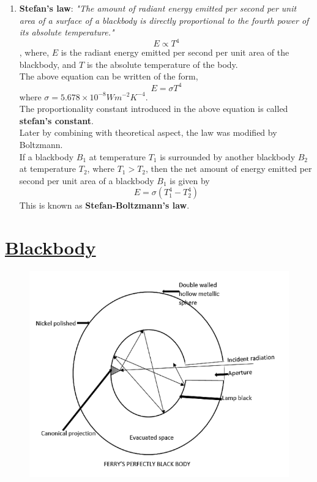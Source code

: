 \documentclass[14pt,a4paper]{article}
\begin{document}
\begin{enumerate}
    \item \textbf{Stefan's law}:  \textit{"The amount of radiant energy emitted per second per unit area of a surface of a blackbody is directly proportional to the fourth power of its absolute temperature."}
    \begin{equation}
        E \propto T^{4}
    \end{equation},
    where, $E$ is the radiant energy emitted per second per unit area of the blackbody, and $T$ is the absolute temperature of the body.\\
    The above equation can be written of the form,
    \begin{equation}
        E = \sigma T^{4}
    \end{equation}
    where $\sigma = 5.678 \times 10^{-8} Wm^{-2}K^{-4}$.\\
    The proportionality constant introduced in the above equation is called \textbf{stefan's constant}.\\
    Later by combining with theoretical aspect, the law was modified by Boltzmann.\\
    If a blackbody $B_{1}$ at temperature $T_{1}$ is surrounded by another blackbody $B_{2}$ at temperature $T_{2}$, where $T_{1}>T_{2}$, then the net amount of energy emitted per second per unit area of a blackbody $B_{1}$ is given by
    \begin{equation}
        E = \sigma(T^{4}_{1} - T^{4}_{2})
    \end{equation}
    This is known as \textbf{Stefan-Boltzmann's law}.
\end{enumerate}

\section{\underline{Blackbody}}
\begin{figure} %
    \centering
    \includegraphics[scale=0.29]{blackbody.png}
\end{figure}
\end{document}
